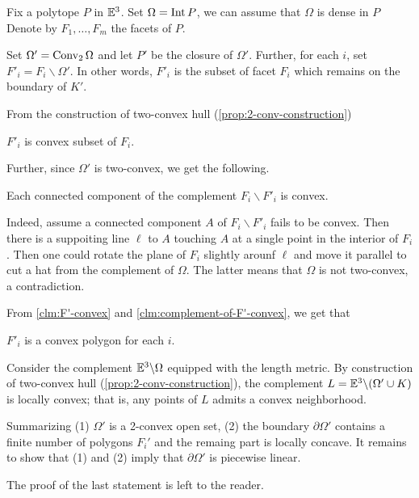 Fix a polytope $P$ in $\mathbb{E}^3$.
Set $\Omega=\mathop{\rm Int}\nolimits P$, we can assume that $\Omega$ is dense in $P$
Denote by $F_1,\dots,F_m$ the facets of $P$.

Set $\Omega'=\mathop{\rm Conv}\nolimits_2\Omega$ and let $P'$ be the closure of $\Omega'$.
Further, 
for each $i$, 
set $F'_i=F_i\backslash \Omega'$.
In other words, 
$F'_i$ is the subset of facet $F_i$ 
which remains on the boundary of $K'$.

From the construction of two-convex hull (\ref{prop:2-conv-construction})

\begin{clm}{}\label{clm:F'-convex}
$F'_i$ is convex subset of $F_i$.
\end{clm}

Further, since $\Omega'$ is two-convex,
we get the following.

\begin{clm}{}\label{clm:complement-of-F'-convex}
Each connected component of the complement $F_i\backslash F'_i$ is convex.
\end{clm}

Indeed, assume a connected component $A$ of $F_i\backslash F'_i$ fails to be convex.
Then there is a suppoiting line $\ell$ to $A$ touching $A$ at a single point in the interior of $F_i$.
Then one could rotate the plane of $F_i$ slightly arounf $\ell$ and move it parallel to cut a hat from the complement of $\Omega$.
The latter means that $\Omega$ is not two-convex, 
a contradiction.
\claimqeds

From \ref{clm:F'-convex} and \ref{clm:complement-of-F'-convex}, we get that 

\begin{clm}{}$F'_i$ is a convex polygon for each $i$.
\end{clm}

Consider the complement 
$\mathbb{E}^3\backslash \Omega$ 
equipped with the length metric.
By construction of two-convex hull (\ref{prop:2-conv-construction}), 
the complement $L=\EE^3\backslash (\Omega'\cup K)$
is locally convex;
that is, any points of $L$ admits a convex neighborhood.

Summarizing (1)
$\Omega'$ is a 2-convex open set,
(2) the boundary $\partial\Omega'$ 
contains a finite number of polygons $F_i'$
and the remaing part is locally concave.
It remains to show that (1) and (2) imply that $\partial\Omega'$
is piecewise linear.

The proof of the last statement is left to the reader.%
\qeds

